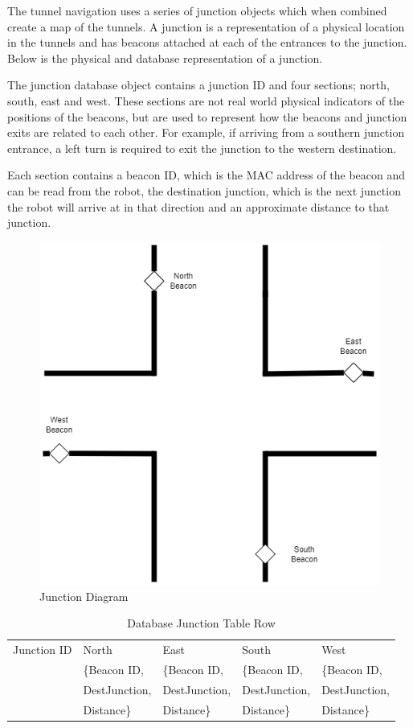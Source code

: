 \documentclass[12pt]{report}
\begin{document}
The tunnel navigation uses a series of junction objects which when combined create a map of the tunnels. A junction is a representation of a physical location in the tunnels and has beacons attached at each of the entrances to the junction. Below is the physical and database representation of a junction.

The junction database object contains a junction ID and four sections; north, south, east and west. These sections are not real world physical indicators of the positions of the beacons, but are used to represent how the beacons and junction exits are related to each other. For example, if arriving from a southern junction entrance, a left turn is required to exit the junction to the western destination.

Each section contains a beacon ID, which is the MAC address of the beacon and can be read from the robot, the destination junction, which is the next junction the robot will arrive at in that direction and an approximate distance to that junction.

\begin{figure}[H]
\caption{Junction Diagram}
\centering
\includegraphics[scale=0.6]{images/Junction Diagram.png}
\centering
\end{figure}

\begin{table}[H]
\centering
\caption{Database Junction Table Row}
\centering
\begin{tabular} { | p{1.5cm} | p{3cm} | p{3cm} | p{3cm} | p{3cm} | }
\hline
Junction ID & North & East & South & West\\
& \{Beacon ID, & \{Beacon ID, & \{Beacon ID, & \{Beacon ID, \\
&DestJunction,&DestJunction,&DestJunction,&DestJunction,\\
&Distance\}&Distance\}&Distance\}&Distance\}\\
\hline

\end{tabular}
\end{table}%
\end{document}
